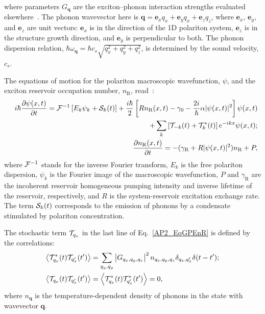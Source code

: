 where parameters $G_{\mathbf{q}}$ are the exciton--phonon interaction strengths evaluated elsewhere~\cite{Hartwell:2010aa}.
The phonon wavevector here is
$\mathbf{q}=\mathbf{e}_xq_x+\mathbf{e}_yq_x+\mathbf{e}_zq_z$, where $\mathbf{e}_x$,
$\mathbf{e}_y$, and $\mathbf{e}_z$ are unit vectors: $\mathbf{e}_x$ is in the direction of the 1D polariton system, $\mathbf{e}_z$ is in the structure growth direction, and $\mathbf{e}_y$ is perpendicular to both.
%
The phonon dispersion relation, $\hbar\omega_{\mathbf{q}}=\hbar
c_s\sqrt{q_x^2+q_y^2+q_z^2}$, is determined by the sound velocity, $c_s$.

The equations of motion for the polariton macroscopic wavefunction, $\psi$, and the exciton reservoir occupation number, $n_\textrm{R}$, read~\cite{Savenko:2013aa,Wouters:2007aa}:
%
\begin{eqnarray}
	\label{AP2_EqGPEnR}
	&&i\hbar\frac{\partial\psi(x,t)}{\partial t}={\cal F}^{-1}\left[E_k\psi_k+{\cal S}_k(t)\right] +\frac{i\hbar}{2}\left[Rn_\textrm{R}(x,t)-\gamma_0-\frac{2i}{\hbar}\alpha|\psi({x},t)|^2\right]\psi(x,t)\nonumber \\
	&&~~~~~~~~~~~~~~~~~~  +\sum_k\left[{\cal T}_{-k}(t)+{\cal T}^*_k(t)\right]e^{-ikx}\psi(x,t);\\
	\label{AP2_EqGPEnR2}
	&&\frac{\partial n_\textrm{R}(x,t)}{\partial t}=-(\gamma_\textrm{R}+R|\psi(x,t)|^2)n_\textrm{R}+P,
\end{eqnarray}
%
where ${\cal F}^{-1}$ stands for the inverse Fourier transform, $E_k$ is the free polariton dispersion, $\psi_k$ is the Fourier image of the macroscopic wavefunction, $P$ and $\gamma_\textrm{R}$ are the incoherent reservoir homogeneous pumping intensity and inverse lifetime of the reservoir, respectively, and $R$ is the system-reservoir excitation exchange rate.
The term ${\cal S}_k(t)$ corresponds to the emission of phonons by a condensate stimulated by polariton concentration.

The stochastic term ${\cal T}_{q_x}$ in the last line of Eq.~\eqref{AP2_EqGPEnR} is defined by the correlations:
%
\begin{align}
	\left<{\cal T}_{q_x}^*(t){\cal T}_{q_x^\prime}(t^\prime)\right>&=\sum_{q_y,q_y}\left|G_{{q_x,q_y,q_z}}\right|^2n_{q_x,q_y,q_z}\delta_{q_x,q_x^\prime}\delta(t-t^\prime);\notag\\
	\left<{\cal T}_{q_x}(t){\cal T}_{q_x^\prime}(t^\prime)\right>&=
	\left<{\cal T}_{q_x}^*(t){\cal T}_{q_x^\prime}^*(t^\prime)\right>=0,
	\label{AP2_EqThermal}
\end{align}
%
where $n_{\mathbf{q}}$ is the temperature-dependent density of phonons in the state with wavevector $\mathbf{q}$.

